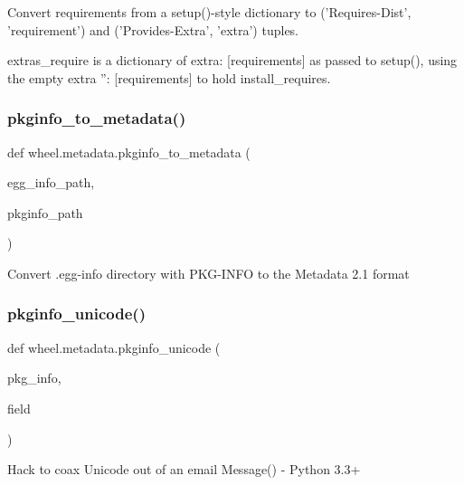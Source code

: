 \begin{DoxyVerb}Convert requirements from a setup()-style dictionary to ('Requires-Dist', 'requirement')
and ('Provides-Extra', 'extra') tuples.

extras_require is a dictionary of {extra: [requirements]} as passed to setup(),
using the empty extra {'': [requirements]} to hold install_requires.
\end{DoxyVerb}
 \mbox{\label{namespacewheel_1_1metadata_aa37a93d2d42385aab109e48f72755463}} 
\subsubsection{\texorpdfstring{pkginfo\+\_\+to\+\_\+metadata()}{pkginfo\_to\_metadata()}}
{\footnotesize\ttfamily def wheel.\+metadata.\+pkginfo\+\_\+to\+\_\+metadata (\begin{DoxyParamCaption}\item[{}]{egg\+\_\+info\+\_\+path,  }\item[{}]{pkginfo\+\_\+path }\end{DoxyParamCaption})}

\begin{DoxyVerb}Convert .egg-info directory with PKG-INFO to the Metadata 2.1 format
\end{DoxyVerb}
 \mbox{\label{namespacewheel_1_1metadata_ab406e279f8fbc5b9da29dc5c15dc952e}} 
\subsubsection{\texorpdfstring{pkginfo\+\_\+unicode()}{pkginfo\_unicode()}}
{\footnotesize\ttfamily def wheel.\+metadata.\+pkginfo\+\_\+unicode (\begin{DoxyParamCaption}\item[{}]{pkg\+\_\+info,  }\item[{}]{field }\end{DoxyParamCaption})}

\begin{DoxyVerb}Hack to coax Unicode out of an email Message() - Python 3.3+\end{DoxyVerb}
 \mbox{\label{namespacewheel_1_1metadata_abd414d4e8d357ff4a844dfc7e9dbadce}} 
